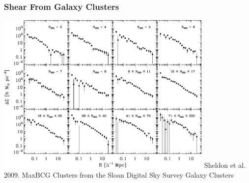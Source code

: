 \documentclass{beamer}
\begin{document}
\frame
{
    \frametitle{Shear From Galaxy Clusters}

    \begin{center}
        \includegraphics[width=0.8\textwidth]{maxbcg_sample21-22_ngals200_12_jackknife.pdf}
        \newline
        Sheldon et al. 2009.  MaxBCG Clusters from the Sloan Digital Sky Survey Galaxy Clusters
    \end{center}
}
\end{document}
